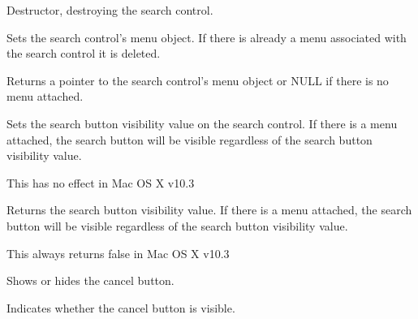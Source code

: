 
Destructor, destroying the search control.


\label{wxsearchctrlsetmenu}


Sets the search control's menu object.  If there is already a menu associated with
the search control it is deleted.




\label{wxsearchctrlgetmenu}


Returns a pointer to the search control's menu object or NULL if there is no 
menu attached.


\label{wxsearchctrlsetsearchbuttonvisible}


Sets the search button visibility value on the search control.  
If there is a menu attached, the search button will be visible regardless of the search
button visibility value. 

This has no effect in Mac OS X v10.3


\label{wxsearchctrlgetsearchbuttonvisible}


Returns the search button visibility value.  
If there is a menu attached, the search button will be visible regardless of the search
button visibility value. 

This always returns false in Mac OS X v10.3


\label{wxsearchctrlsetcancelbuttonvisible}


Shows or hides the cancel button.


\label{wxsearchctrlgetcancelbuttonvisible}


Indicates whether the cancel button is visible.
